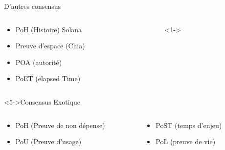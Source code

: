 \documentclass[presentation]{beamer}
\begin{document}
\begin{frame}[label={sec:orgbfd5388}]{D'autres consensus}
\begin{columns}
\begin{column}{0.4\columnwidth}
\begin{block}{}
\begin{itemize}
\item <1-> PoH (Histoire) Solana
\item <2-> Preuve d'espace (Chia)
\item <3-> POA (autorité)
\end{itemize}

\begin{itemize}
\item <4-> PoET (elapsed Time)
\end{itemize}
\end{block}
\end{column}

\begin{column}{0.6\columnwidth}
\begin{block}<1->{}
\end{block}
\end{column}
\end{columns}

\begin{block}<5->{Consensus Exotique}
\begin{columns}
\begin{column}{0.5\columnwidth}
\begin{block}{}
\begin{itemize}
\item PoH (Preuve de non dépense)
\item PoU (Preuve d'usage)
\end{itemize}
\end{block}
\end{column}
\begin{column}{0.5\columnwidth}
\begin{block}{}
\begin{itemize}
\item PoST (temps d'enjeu)
\item PoL (preuve de vie)
\end{itemize}
\end{block}
\end{column}
\end{columns}
\end{block}
\end{frame}
\end{document}
